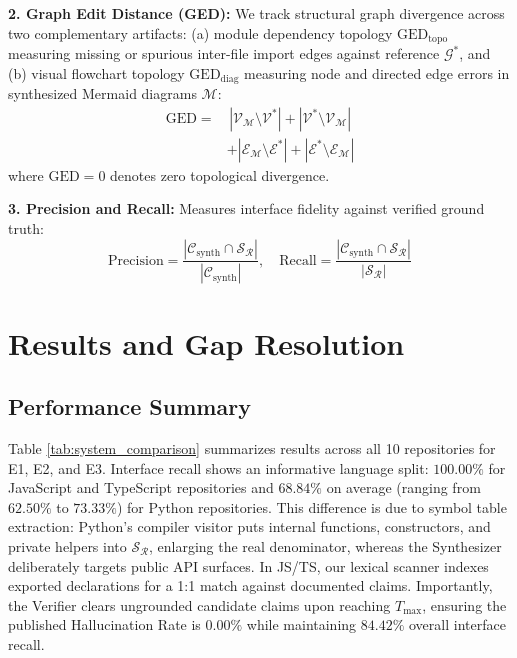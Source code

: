 \documentclass[conference]{IEEEtran}
\begin{document}
\textbf{2. Graph Edit Distance (GED):} We track structural graph divergence across two complementary artifacts: (a) module dependency topology $\mathrm{GED}_{\mathrm{topo}}$ measuring missing or spurious inter-file import edges against reference $\mathcal{G}^*$, and (b) visual flowchart topology $\mathrm{GED}_{\mathrm{diag}}$ measuring node and directed edge errors in synthesized Mermaid diagrams $\mathcal{M}$:
\begin{align}
\mathrm{GED} = & \, |\mathcal{V}_{\mathcal{M}} \setminus \mathcal{V}^*| + |\mathcal{V}^* \setminus \mathcal{V}_{\mathcal{M}}| \nonumber \\
& + |\mathcal{E}_{\mathcal{M}} \setminus \mathcal{E}^*| + |\mathcal{E}^* \setminus \mathcal{E}_{\mathcal{M}}|
\end{align}
where $\mathrm{GED}=0$ denotes zero topological divergence.

\textbf{3. Precision and Recall:} Measures interface fidelity against verified ground truth:
\begin{equation}
\mathrm{Precision} = \frac{|\mathcal{C}_{\text{synth}} \cap \mathcal{S}_{\mathcal{R}}|}{|\mathcal{C}_{\text{synth}}|}, \quad \mathrm{Recall} = \frac{|\mathcal{C}_{\text{synth}} \cap \mathcal{S}_{\mathcal{R}}|}{|\mathcal{S}_{\mathcal{R}}|}
\end{equation}

\section{Results and Gap Resolution}

\subsection{Performance Summary}
Table \ref{tab:system_comparison} summarizes results across all 10 repositories for E1, E2, and E3. Interface recall shows an informative language split: $100.00\%$ for JavaScript and TypeScript repositories and $68.84\%$ on average (ranging from $62.50\%$ to $73.33\%$) for Python repositories. This difference is due to symbol table extraction: Python's compiler visitor puts internal functions, constructors, and private helpers into $\mathcal{S}_{\mathcal{R}}$, enlarging the real denominator, whereas the Synthesizer deliberately targets public API surfaces. In JS/TS, our lexical scanner indexes exported declarations for a 1:1 match against documented claims. Importantly, the Verifier clears ungrounded candidate claims upon reaching $T_{\max}$, ensuring the published Hallucination Rate is $0.00\%$ while maintaining $84.42\%$ overall interface recall.
\end{document}
